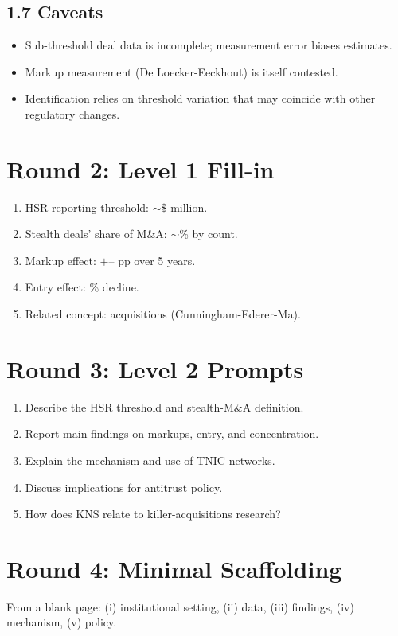 \documentclass[11pt]{article}
\newcommand{\blank}[1]{\underline{\hspace{#1}}}
\begin{document}
\subsection*{1.7 Caveats}
\begin{alertbox}
\begin{itemize}
\item Sub-threshold deal data is incomplete; measurement error biases estimates.
\item Markup measurement (De Loecker-Eeckhout) is itself contested.
\item Identification relies on threshold variation that may coincide with other regulatory changes.
\end{itemize}
\end{alertbox}

\section*{Round 2: Level 1 Fill-in}
\begin{enumerate}
\item HSR reporting threshold: $\sim\$$\blank{1cm} million.
\item Stealth deals' share of M\&A: $\sim$\blank{1cm}\% by count.
\item Markup effect: $+$\blank{1cm}--\blank{1cm} pp over 5 years.
\item Entry effect: \blank{1cm}\% decline.
\item Related concept: \blank{2cm} acquisitions (Cunningham-Ederer-Ma).
\end{enumerate}

\section*{Round 3: Level 2 Prompts}
\begin{enumerate}
\item Describe the HSR threshold and stealth-M\&A definition.
\item Report main findings on markups, entry, and concentration.
\item Explain the mechanism and use of TNIC networks.
\item Discuss implications for antitrust policy.
\item How does KNS relate to killer-acquisitions research?
\end{enumerate}

\section*{Round 4: Minimal Scaffolding}
From a blank page: (i) institutional setting, (ii) data, (iii) findings, (iv) mechanism, (v) policy.
\end{document}
